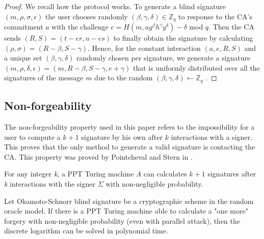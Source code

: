 \documentclass[conference]{llncs}
\begin{document}
\begin{proof}
We recall how the protocol works. To generate a blind signature $(m,\rho,\sigma,\epsilon)$ the user chooses randomly $(\beta,\gamma,\delta)\in \mathbb{Z}_q$ to response to the CA's commitment $a$ with the challenge $c=H(m,ag^\beta h^\gamma y^\delta) -\delta$ mod $q$. Then the CA sends $(R,S)=(t-er,u-es)$ to finally obtain the signature by calculating $(\rho,\sigma)=(R-\beta,S-\gamma)$.
Hence, for the constant interaction $(a,e,R,S)$ and a unique set $(\beta,\gamma,\delta)$ randomly chosen per signature, we generate a signature $(m,\rho,\delta,\epsilon)=(m,R-\beta,S-\gamma,e+\gamma)$ that is uniformly distributed over all the signatures of the message $m$ due to the random $(\beta,\gamma,\delta) \gets \mathbb{Z}_q$ \cite{schnorr2001security}.
\end{proof}

\subsection{Non-forgeability}
The non-forgeability property used in this paper refers to the impossibility for a user to compute a $k+1$ signature by his own after $k$ interactions with a signer. This proves that the only method to generate a valid signature is contacting the CA. This property was proved by Pointcheval and Stern in \cite{pointcheval1996provably}.

\begin{definition}
For any integer \textit{k}, a PPT Turing machine \textit{A} can calculates $k+1$ signatures after \textit{k} interactions with the signer $\Sigma$ with non-negligible probability.  
\end{definition}

\begin{theorem}
Let Okamoto-Schnorr blind signature be a cryptographic scheme in the random oracle model. If there is a PPT Turing machine able to calculate a "one more" forgery with non-negligible probability (even with parallel attack), then the discrete logarithm can be solved in polynomial time.
\end{theorem}
\end{document}
